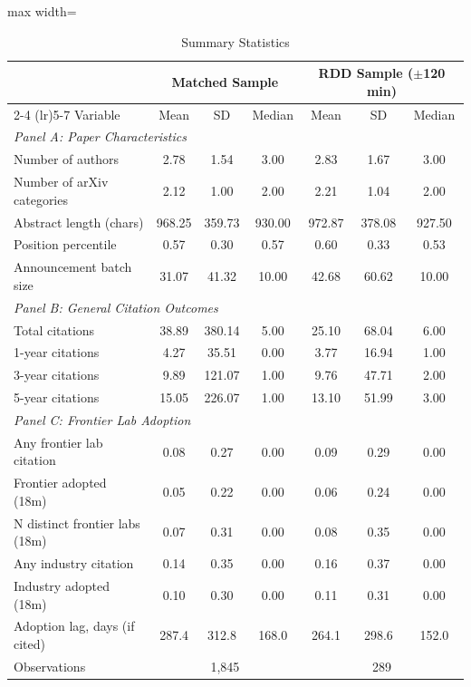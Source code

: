 \begin{table}[htbp]
\centering
\caption{Summary Statistics}
\label{tab:summary}
\begin{adjustbox}{max width=\textwidth}
\begin{tabular}{lcccccc}
\hline\hline
& \multicolumn{3}{c}{Matched Sample} & \multicolumn{3}{c}{RDD Sample ($\pm$120 min)} \\
\cmidrule(lr){2-4} \cmidrule(lr){5-7}
Variable & Mean & SD & Median & Mean & SD & Median \\
\hline
\multicolumn{7}{l}{\textit{Panel A: Paper Characteristics}} \\
Number of authors & 2.78 & 1.54 & 3.00 & 2.83 & 1.67 & 3.00 \\
Number of arXiv categories & 2.12 & 1.00 & 2.00 & 2.21 & 1.04 & 2.00 \\
Abstract length (chars) & 968.25 & 359.73 & 930.00 & 972.87 & 378.08 & 927.50 \\
Position percentile & 0.57 & 0.30 & 0.57 & 0.60 & 0.33 & 0.53 \\
Announcement batch size & 31.07 & 41.32 & 10.00 & 42.68 & 60.62 & 10.00 \\
\hline
\multicolumn{7}{l}{\textit{Panel B: General Citation Outcomes}} \\
Total citations & 38.89 & 380.14 & 5.00 & 25.10 & 68.04 & 6.00 \\
1-year citations & 4.27 & 35.51 & 0.00 & 3.77 & 16.94 & 1.00 \\
3-year citations & 9.89 & 121.07 & 1.00 & 9.76 & 47.71 & 2.00 \\
5-year citations & 15.05 & 226.07 & 1.00 & 13.10 & 51.99 & 3.00 \\
\hline
\multicolumn{7}{l}{\textit{Panel C: Frontier Lab Adoption}} \\
Any frontier lab citation & 0.08 & 0.27 & 0.00 & 0.09 & 0.29 & 0.00 \\
Frontier adopted (18m) & 0.05 & 0.22 & 0.00 & 0.06 & 0.24 & 0.00 \\
N distinct frontier labs (18m) & 0.07 & 0.31 & 0.00 & 0.08 & 0.35 & 0.00 \\
Any industry citation & 0.14 & 0.35 & 0.00 & 0.16 & 0.37 & 0.00 \\
Industry adopted (18m) & 0.10 & 0.30 & 0.00 & 0.11 & 0.31 & 0.00 \\
Adoption lag, days (if cited) & 287.4 & 312.8 & 168.0 & 264.1 & 298.6 & 152.0 \\
\hline
Observations & \multicolumn{3}{c}{1,845} & \multicolumn{3}{c}{289} \\

\end{tabular}
\end{adjustbox}
\end{table}
